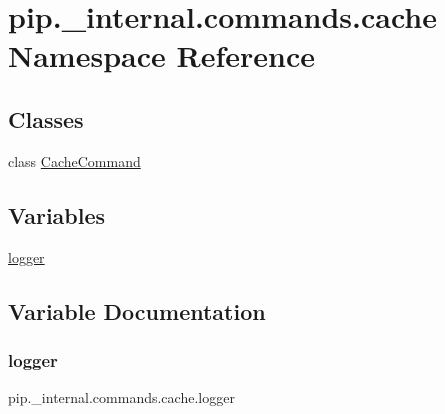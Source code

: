 \hypertarget{namespacepip_1_1__internal_1_1commands_1_1cache}{}\section{pip.\+\_\+internal.\+commands.\+cache Namespace Reference}
\label{namespacepip_1_1__internal_1_1commands_1_1cache}
\subsection*{Classes}
\begin{DoxyCompactItemize}
\item 
class \hyperlink{classpip_1_1__internal_1_1commands_1_1cache_1_1CacheCommand}{Cache\+Command}
\end{DoxyCompactItemize}
\subsection*{Variables}
\begin{DoxyCompactItemize}
\item 
\hyperlink{namespacepip_1_1__internal_1_1commands_1_1cache_a1d5cbd9e2af0c242d94ab98d82a0555c}{logger}
\end{DoxyCompactItemize}


\subsection{Variable Documentation}
\mbox{\label{namespacepip_1_1__internal_1_1commands_1_1cache_a1d5cbd9e2af0c242d94ab98d82a0555c}} 
\subsubsection{\texorpdfstring{logger}{logger}}
{\footnotesize\ttfamily pip.\+\_\+internal.\+commands.\+cache.\+logger}

